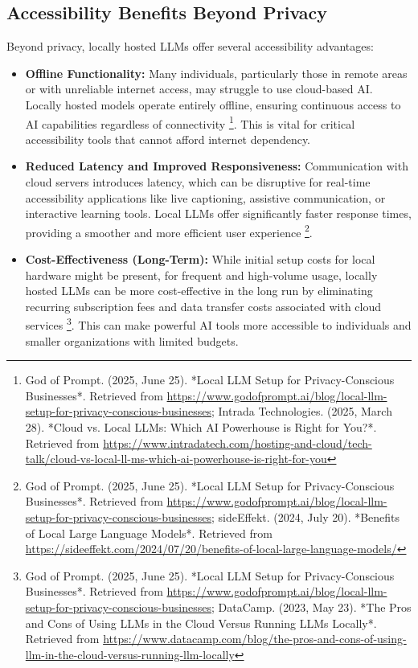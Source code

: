\subsection{Accessibility Benefits Beyond Privacy}
Beyond privacy, locally hosted LLMs offer several accessibility advantages:
\begin{itemize}

    \item \textbf{Offline Functionality:} Many individuals, particularly those in remote areas or with unreliable internet access, may struggle to use cloud-based AI. Locally hosted models operate entirely offline, ensuring continuous access to AI capabilities regardless of connectivity \footnote{God of Prompt. (2025, June 25). *Local LLM Setup for Privacy-Conscious Businesses*. Retrieved from \url{https://www.godofprompt.ai/blog/local-llm-setup-for-privacy-conscious-businesses}; Intrada Technologies. (2025, March 28). *Cloud vs. Local LLMs: Which AI Powerhouse is Right for You?*. Retrieved from \url{https://www.intradatech.com/hosting-and-cloud/tech-talk/cloud-vs-local-ll-ms-which-ai-powerhouse-is-right-for-you}}. This is vital for critical accessibility tools that cannot afford internet dependency.

    \item \textbf{Reduced Latency and Improved Responsiveness:} Communication with cloud servers introduces latency, which can be disruptive for real-time accessibility applications like live captioning, assistive communication, or interactive learning tools. Local LLMs offer significantly faster response times, providing a smoother and more efficient user experience \footnote{God of Prompt. (2025, June 25). *Local LLM Setup for Privacy-Conscious Businesses*. Retrieved from \url{https://www.godofprompt.ai/blog/local-llm-setup-for-privacy-conscious-businesses}; sideEffekt. (2024, July 20). *Benefits of Local Large Language Models*. Retrieved from \url{https://sideeffekt.com/2024/07/20/benefits-of-local-large-language-models/}}.

    \item \textbf{Cost-Effectiveness (Long-Term):} While initial setup costs for local hardware might be present, for frequent and high-volume usage, locally hosted LLMs can be more cost-effective in the long run by eliminating recurring subscription fees and data transfer costs associated with cloud services \footnote{God of Prompt. (2025, June 25). *Local LLM Setup for Privacy-Conscious Businesses*. Retrieved from \url{https://www.godofprompt.ai/blog/local-llm-setup-for-privacy-conscious-businesses}; DataCamp. (2023, May 23). *The Pros and Cons of Using LLMs in the Cloud Versus Running LLMs Locally*. Retrieved from \url{https://www.datacamp.com/blog/the-pros-and-cons-of-using-llm-in-the-cloud-versus-running-llm-locally}}. This can make powerful AI tools more accessible to individuals and smaller organizations with limited budgets.


\end{itemize}
